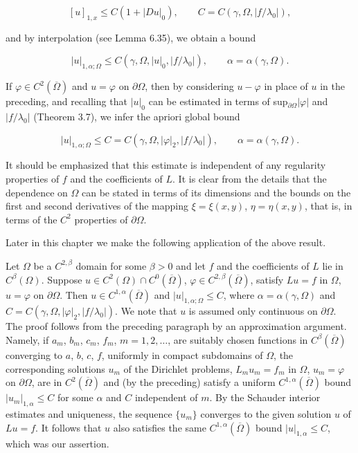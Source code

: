 \[
[u]_{1,x}\leq C(1+|Du|_0), \qquad C=C(\gamma,\Omega,|f/\lambda_0|),
\]

and by interpolation (see Lemma 6.35), we obtain a bound

\[
|u|_{1,\alpha;\Omega}\leq C(\gamma,\Omega,|u|_0,|f/\lambda_0|), \qquad \alpha=\alpha(\gamma,\Omega).
\]

If $\varphi\in C^2(\overline{\Omega})$ and $u=\varphi$ on $\partial\Omega$, then by considering $u-\varphi$ in place of $u$ in the preceding, and recalling that $|u|_0$ can be estimated in terms of sup$_{\partial\Omega}|\varphi|$ and $|f/\lambda_0|$ (Theorem 3.7), we infer the apriori global bound

\[
|u|_{1,\alpha;\Omega}\leq C=C(\gamma,\Omega,|\varphi|_2,|f/\lambda_0|), \qquad \alpha=\alpha(\gamma,\Omega).
\]

It should be emphasized that this estimate is independent of any regularity properties of $f$ and the coefficients of $L$. It is clear from the details that the dependence on $\Omega$ can be stated in terms of its dimensions and the bounds on the first and second derivatives of the mapping $\xi=\xi(x,y)$, $\eta=\eta(x,y)$, that is, in terms of the $C^2$ properties of $\partial\Omega$.

\noindent\hspace*{2em}Later in this chapter we make the following application of the above result.

Let $\Omega$ be a $C^{2,\beta}$ domain for some $\beta>0$ and let $f$ and the coefficients of $L$ lie in $C^\beta(\Omega)$. Suppose $u\in C^2(\Omega)\cap C^0(\overline{\Omega})$, $\varphi\in C^{2,\beta}(\overline{\Omega})$, satisfy $Lu=f$ in $\Omega$, $u=\varphi$ on $\partial\Omega$. Then $u\in C^{1,\alpha}(\overline{\Omega})$ and $|u|_{1,\alpha;\Omega}\leq C$, where $\alpha=\alpha(\gamma,\Omega)$ and $C=C(\gamma,\Omega,|\varphi|_2,|f/\lambda_0|)$. We note that $u$ is assumed only continuous on $\partial\Omega$. The proof follows from the preceding paragraph by an approximation argument. Namely, if $a_m$, $b_m$, $c_m$, $f_m$, $m=1,2,\dots$, are suitably chosen functions in $C^\beta(\overline{\Omega})$ converging to $a$, $b$, $c$, $f$, uniformly in compact subdomains of $\Omega$, the corresponding solutions $u_m$ of the Dirichlet problems, $L_m u_m=f_m$ in $\Omega$, $u_m=\varphi$ on $\partial\Omega$, are in $C^2(\overline{\Omega})$ and (by the preceding) satisfy a uniform $C^{1,\alpha}(\overline{\Omega})$ bound $|u_m|_{1,\alpha}\leq C$ for some $\alpha$ and $C$ independent of $m$. By the Schauder interior estimates and uniqueness, the sequence $\{u_m\}$ converges to the given solution $u$ of $Lu=f$. It follows that $u$ also satisfies the same $C^{1,\alpha}(\overline{\Omega})$ bound $|u|_{1,\alpha}\leq C$, which was our assertion.

